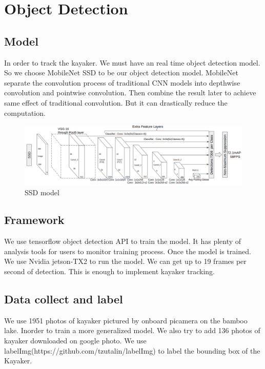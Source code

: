 \section{Object Detection}

\subsection{Model}

In order to track the kayaker. We must have an real time object detection model. So we choose MobileNet SSD to be our object detection model.
MobileNet separate the convolution process of traditional CNN models into depthwise convolution and pointwise convolution. Then combine the result later to achieve same effect of traditional convolution. But it can drastically reduce the computation.

\begin{figure}[H]
    \includegraphics[width=1\columnwidth]{images/mobilenetssd.png}
    \centering
    \caption{SSD model}
    \label{figure:mobilenetssd}
\end{figure}

\subsection{Framework}

We use tensorflow object detection API to train the model. It has plenty of analysis tools for users to monitor training process. Once the model is trained. We use Nvidia jetson-TX2 to run the model. We can get up to 19 frames per second of detection. This is enough to implement kayaker tracking.

\subsection{Data collect and label}

We use 1951 photos of kayaker pictured by onboard picamera on the bamboo lake. Inorder to train a more generalized model. We also try to add 136 photos of kayaker downloaded on google photo. We use labelImg(https://github.com/tzutalin/labelImg) to label the bounding box of the Kayaker.

